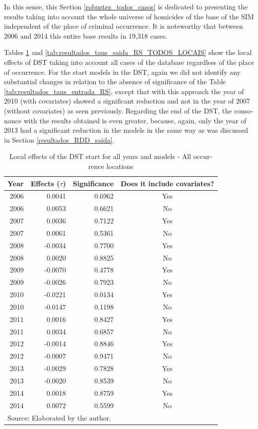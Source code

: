 \documentclass[12pt,openright,oneside,a4paper,english,french,spanish]{abntex2}
\numberwithin{table}{section} %
\numberwithin{figure}{section} %
\begin{document}
\begin{otherlanguage}{english}
In this sense, this Section \ref{robustez_todos_casos} is dedicated to presenting the results taking into account the whole universe of homicides of the base of the SIM independent of the place of criminal occurrence. It is noteworthy that between 2006 and 2014 this entire base results in 19,318 cases.

Tables \ref{tab:resultados_taus_entrada_RS_TODOS_LOCAIS} and \ref{tab:resultados_taus_saida_RS_TODOS_LOCAIS} show the local effects of DST taking into account all cases of the database regardless of the place of occurrence. For the start models in the DST, again we did not identify any substantial changes in relation to the absence of significance of the Table \ref{tab:resultados_taus_entrada_RS}, except that with this approach the year of 2010 (with covariates) showed a significant reduction and not in the year of 2007 (without covariates) as seen previously. Regarding the end of the DST, the consonance with the results obtained is even greater, because, again, only the year of 2013 had a significant reduction in the models in the same way as was discussed in Section \ref{resultados_RDD_saida}.

\begin{table}[H]
\caption{Local effects of the DST start for all years and models - All occurrence locations}
\begin{center}
\begin{small}
\begin{tabular}{rrrc}
  \hline
Year & Effects ($\tau$) & Significance & Does it include covariates? \\
  \hline
2006 & 0.0041 & 0.6962 & Yes \\ 
2006 & 0.0053 & 0.6621 & No \\ 
2007 & 0.0036 & 0.7122 & Yes \\ 
2007 & 0.0061 & 0.5361 & No \\ 
2008 & -0.0034 & 0.7700 & Yes \\ 
2008 & 0.0020 & 0.8825 & No \\ 
2009 & -0.0070 & 0.4778 & Yes \\ 
2009 & -0.0026 & 0.7923 & No \\ 
2010 & -0.0221 & 0.0134 & Yes \\ 
2010 & -0.0147 & 0.1198 & No \\ 
2011 & 0.0016 & 0.8427 & Yes \\ 
2011 & 0.0034 & 0.6857 & No \\ 
2012 & -0.0014 & 0.8846 & Yes \\ 
2012 & -0.0007 & 0.9471 & No \\ 
2013 & -0.0029 & 0.7828 & Yes \\ 
2013 & -0.0020 & 0.8539 & No \\ 
2014 & 0.0018 & 0.8759 & Yes \\ 
2014 & 0.0072 & 0.5599 & No \\ 
   \hline
\multicolumn{4}{l}{Source: Elaborated by the author.}
\end{tabular}
\end{small}
\end{center}
\label{tab:resultados_taus_entrada_RS_TODOS_LOCAIS}
\end{table}



\end{otherlanguage}
\end{document}
